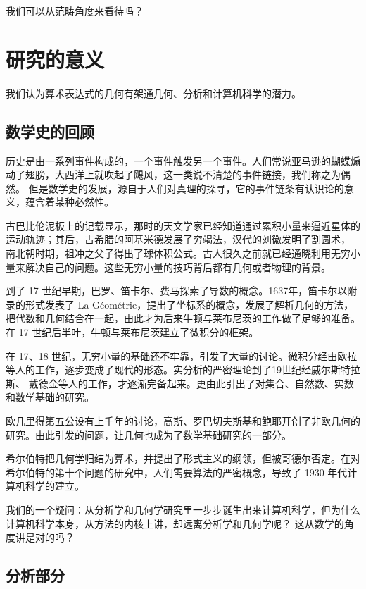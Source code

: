\documentclass[a4paper,12pt]{article}
\numberwithin{problem}{section}
\numberwithin{definition}{section}
\numberwithin{lemma}{section}
\numberwithin{proposition}{section}
\numberwithin{theorem}{section}
\numberwithin{grammar}{section}
\numberwithin{program}{section}
\numberwithin{convention}{section}
\numberwithin{corollary}{section}
\begin{document}
我们可以从范畴角度来看待吗？

\newpage

\section{研究的意义}

我们认为算术表达式的几何有架通几何、分析和计算机科学的潜力。

\subsection{数学史的回顾}

历史是由一系列事件构成的，一个事件触发另一个事件。人们常说亚马逊的蝴蝶煽动了翅膀，大西洋上就吹起了飓风，这一类说不清楚的事件链接，我们称之为偶然。
但是数学史的发展，源自于人们对真理的探寻，它的事件链条有认识论的意义，蕴含着某种必然性。

古巴比伦泥板上的记载显示，那时的天文学家已经知道通过累积小量来逼近星体的运动轨迹；其后，古希腊的阿基米德发展了穷竭法，汉代的刘徽发明了割圆术，
南北朝时期，祖冲之父子得出了球体积公式。古人很久之前就已经通晓利用无穷小量来解决自己的问题。这些无穷小量的技巧背后都有几何或者物理的背景。

到了 17 世纪早期，巴罗、笛卡尔、费马探索了导数的概念。1637年，笛卡尔以附录的形式发表了 La Géométrie，提出了坐标系的概念，发展了解析几何的方法，
把代数和几何结合在一起，由此才为后来牛顿与莱布尼茨的工作做了足够的准备。在 17 世纪后半叶，牛顿与莱布尼茨建立了微积分的框架。

在 17、18 世纪，无穷小量的基础还不牢靠，引发了大量的讨论。微积分经由欧拉等人的工作，逐步变成了现代的形态。实分析的严密理论到了19世纪经威尔斯特拉斯、
戴德金等人的工作，才逐渐完备起来。更由此引出了对集合、自然数、实数和数学基础的研究。

欧几里得第五公设有上千年的讨论，高斯、罗巴切夫斯基和鲍耶开创了非欧几何的研究。由此引发的问题，让几何也成为了数学基础研究的一部分。

希尔伯特把几何学归结为算术，并提出了形式主义的纲领，但被哥德尔否定。在对希尔伯特的第十个问题的研究中，人们需要算法的严密概念，导致了 1930 年代计算机科学的建立。

我们的一个疑问：从分析学和几何学研究里一步步诞生出来计算机科学，但为什么计算机科学本身，从方法的内核上讲，却远离分析学和几何学呢？
这从数学的角度讲是对的吗？

\subsection{分析部分}
\end{document}

